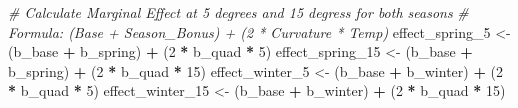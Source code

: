 \documentclass[
]{article}
\newenvironment{Shaded}{\begin{snugshade}}{\end{snugshade}}
\newcommand{\CommentTok}[1]{\textcolor[rgb]{0.56,0.35,0.01}{\textit{#1}}}
\newcommand{\DecValTok}[1]{\textcolor[rgb]{0.00,0.00,0.81}{#1}}
\newcommand{\NormalTok}[1]{#1}
\newcommand{\OtherTok}[1]{\textcolor[rgb]{0.56,0.35,0.01}{#1}}
\newcommand{\SpecialCharTok}[1]{\textcolor[rgb]{0.81,0.36,0.00}{\textbf{#1}}}
\begin{document}
\begin{Shaded}
\begin{Highlighting}[]
\CommentTok{\# Calculate Marginal Effect at 5 degrees and 15 degress for both seasons}
\CommentTok{\# Formula: (Base + Season\_Bonus) + (2 * Curvature * Temp)}
\NormalTok{effect\_spring\_5 }\OtherTok{\textless{}{-}}\NormalTok{ (b\_base }\SpecialCharTok{+}\NormalTok{ b\_spring) }\SpecialCharTok{+}\NormalTok{ (}\DecValTok{2} \SpecialCharTok{*}\NormalTok{ b\_quad }\SpecialCharTok{*} \DecValTok{5}\NormalTok{)}
\NormalTok{effect\_spring\_15 }\OtherTok{\textless{}{-}}\NormalTok{ (b\_base }\SpecialCharTok{+}\NormalTok{ b\_spring) }\SpecialCharTok{+}\NormalTok{ (}\DecValTok{2} \SpecialCharTok{*}\NormalTok{ b\_quad }\SpecialCharTok{*} \DecValTok{15}\NormalTok{)}
\NormalTok{effect\_winter\_5 }\OtherTok{\textless{}{-}}\NormalTok{ (b\_base }\SpecialCharTok{+}\NormalTok{ b\_winter) }\SpecialCharTok{+}\NormalTok{ (}\DecValTok{2} \SpecialCharTok{*}\NormalTok{ b\_quad }\SpecialCharTok{*} \DecValTok{5}\NormalTok{)}
\NormalTok{effect\_winter\_15 }\OtherTok{\textless{}{-}}\NormalTok{ (b\_base }\SpecialCharTok{+}\NormalTok{ b\_winter) }\SpecialCharTok{+}\NormalTok{ (}\DecValTok{2} \SpecialCharTok{*}\NormalTok{ b\_quad }\SpecialCharTok{*} \DecValTok{15}\NormalTok{)}
\end{Highlighting}
\end{Shaded}
\end{document}
